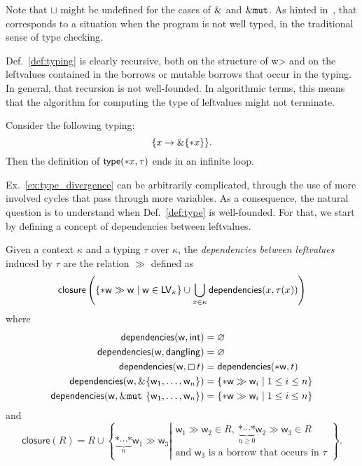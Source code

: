 \noindent
Note that $\sqcup$ might be undefined for the cases of $\&$
and $\&\mathtt{mut}$.
As hinted in~\cite{Pearce21}, that corresponds to a situation when the program
is not well typed, in the traditional sense of type checking.

Def.~\ref{def:typing} is clearly recursive, both on the structure of \<w> and
on the leftvalues contained in the borrows or mutable borrows that occur in the typing.
In general, that recursion is not well-founded. In algorithmic terms, this means
that the algorithm for computing the type of leftvalues might not terminate.

\begin{example}\label{ex:type_divergence}
  Consider the following typing:
  \[
  \{x\to\&\{\mathtt{*}x\}\}.
  \]
  Then the definition of $\mathsf{type}(\mathtt{*}x,\tau)$ ends in an infinite loop.
\end{example}

\noindent
Ex.~\ref{ex:type_divergence} can be arbitrarily complicated, through the
use of more involved cycles that pass through more variables. As a consequence,
the natural question is to understand when Def.~\ref{def:type} is well-founded.
For that, we start by defining a concept of dependencies between leftvalues.

\begin{definition}\label{def:dependencies}
  Given a context $\kappa$ and a typing $\tau$ over $\kappa$, the \emph{dependencies between leftvalues}
  induced by $\tau$ are the relation $\gg$ defined as
  \[
  \mathsf{closure}\left(\{\mathtt{*}\mathsf{w}\gg\mathsf{w}\mid\mathsf{w}\in\mathsf{LV}_\kappa\}
  \cup\bigcup\limits_{x\in\kappa}\mathsf{dependencies}(x,\tau(x))\right)
  \]
  where
  \begin{align*}
    \mathsf{dependencies}(\mathsf{w},\mathsf{int})&=\varnothing\\
    \mathsf{dependencies}(\mathsf{w},\mathsf{dangling})&=\varnothing\\
    \mathsf{dependencies}(\mathsf{w},\boxempty\,{t})&=\mathsf{dependencies}(\mathtt{*}\mathsf{w},t)\\
    \mathsf{dependencies}(\mathsf{w},\&\{\mathsf{w}_1,\ldots,\mathsf{w}_n\})&=\{\mathtt{*}\mathsf{w}\gg\mathsf{w}_i\mid 1\le i\le n\}\\
    \mathsf{dependencies}(\mathsf{w},\&\mathtt{mut}\ \{\mathsf{w}_1,\ldots,\mathsf{w}_n\})&=\{\mathtt{*}\mathsf{w}\gg\mathsf{w}_i\mid 1\le i\le n\}
  \end{align*}
  and
  \[
  \mathsf{closure}(R)=R\cup\left\{\underbrace{\mathtt{*}\cdots\mathtt{*}}_{n}\mathsf{w}_1\gg\mathsf{w}_3\left|
  \begin{array}{l}
    \mathsf{w}_1\gg\mathsf{w}_2\in R,\ \underbrace{\mathtt{*}\cdots\mathtt{*}}_{n\ge 0}\mathsf{w}_2\gg\mathsf{w}_3\in R\\
    \text{and $\mathsf{w_3}$ is a borrow that occurs in $\tau$}
  \end{array}\right.\right\}.
  \]
\end{definition}

